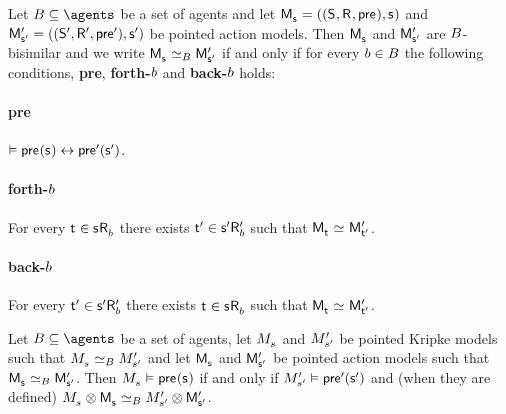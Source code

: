 \begin{definition}
Let $\agentsB \subseteq \agents$ be a set of agents and let $\aPModelAndTuple{\aStateS}$ and $\aPModelAndTupleP{\aStateSP}$ be pointed action models.
Then $\aPModel{\aStateS}$ and ${\mathsf{M}^{\prime}_{{\mathsf{{s}}^{\prime}}}}$ are $B$-bisimilar and we write $\aPModel{\aStateS} \bisimilar[\agentsB] \aPModelP{\aStateSP}$ if and only if for every $b \in B$ the following conditions, {\bf pre}, {\bf forth-$b$} and {\bf back-$b$} holds:

\paragraph{pre}
$\entails \aPrecondition(\aStateS) \iff \aPreconditionP(\aStateSP)$.

\paragraph{forth-$b$}
For every $\aStateT \in \aSuccessorsB{\aStateS}$ there exists ${\mathsf{{t}}^{\prime}} \in {{\mathsf{{s}}^{\prime}}} {\mathsf{R}^{\prime}_{b}}$ such that $\aPModel{\aStateT} \bisimilar \aPModelP{\aStateTP}$.

\paragraph{back-$b$}
For every ${\mathsf{{t}}^{\prime}} \in {{\mathsf{{s}}^{\prime}}} {\mathsf{R}^{\prime}_{b}}$ there exists $\aStateT \in \aSuccessorsB{\aStateS}$ such that $\aPModel{\aStateT} \bisimilar \aPModelP{\aStateTP}$.
\end{definition}

\begin{lemma}
Let $\agentsB \subseteq \agents$ be a set of agents, let $\kPModel{\kStateS}$ and ${M^{\prime}_{{s}^{\prime}}}$ be pointed Kripke models such that $\kPModel{\kStateS} \bisimilar[\agentsB] \kPModelP{\kStateSP}$ and let $\aPModel{\aStateS}$ and ${\mathsf{M}^{\prime}_{{\mathsf{{s}}^{\prime}}}}$ be pointed action models such that $\aPModel{\aStateS} \bisimilar[\agentsB] \aPModelP{\aStateSP}$.
Then $\kPModel{\kStateS} \entails \aPrecondition(\aStateS)$ if and only if ${M^{\prime}_{{s}^{\prime}}} \vDash {\mathsf{pre}^{\prime}}({\mathsf{{s}}^{\prime}})$ and (when they are defined) $\kPModel{\kStateS} \exec \aPModel{\aStateS} \bisimilar[\agentsB] \kPModelP{\kStateSP} \exec \aPModelP{\aStateSP}$.
\end{lemma}

